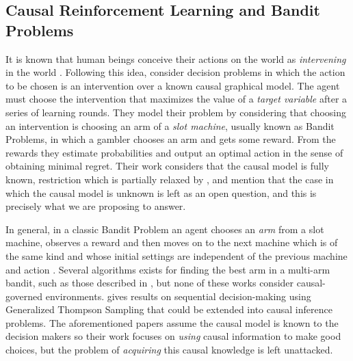 \documentclass{svjour3}                     %
\begin{document}
\subsection{Causal Reinforcement Learning and Bandit Problems}
It is known that human beings conceive their actions on the world as \textit{intervening} in the world \citep{hagmayer2009decision}. Following this idea, \cite{lattimoreNIPS2016} consider decision problems in which the action to be chosen is an intervention over a known causal graphical model. The agent must choose the intervention that maximizes the value of a \textit{target variable} after a series of learning rounds. They model their problem by considering that choosing an intervention is choosing an arm of a \textit{slot machine}, usually known as Bandit Problems, in which a gambler chooses an arm and gets some reward. From the rewards they estimate probabilities and output an optimal action in the sense of obtaining minimal regret. Their work considers that the causal model is fully known, restriction which is partially relaxed by \cite{sen2017identifying}, and mention that the case in which the causal model is unknown is left as an open question, and this is precisely what we are proposing to answer. 

In general, in a classic Bandit Problem an agent chooses an \textit{arm} from a slot machine, observes a reward and then moves on to the next machine which is of the same kind and whose initial settings are independent of the previous machine and action \citep{sutton1998reinforcement}. Several algorithms exists for finding the best arm in a multi-arm bandit, such as those described in \cite{bubeck2009pure,audibert2010best,gabillon2012best,agarwal2014taming,jamieson2014lil,jamieson2014best,chen2015optimal,carpentier2016tight,russo2016simple,kaufmann2016complexity}, but none of these works consider causal-governed environments. \cite{ortega2014generalized} gives results on sequential decision-making using Generalized Thompson Sampling that could be extended into causal inference problems. The aforementioned papers assume the causal model is known to the decision makers so their work focuses on \textit{using} causal information to make good choices, but the problem of \textit{acquiring} this causal knowledge is left unattacked.
\end{document}
